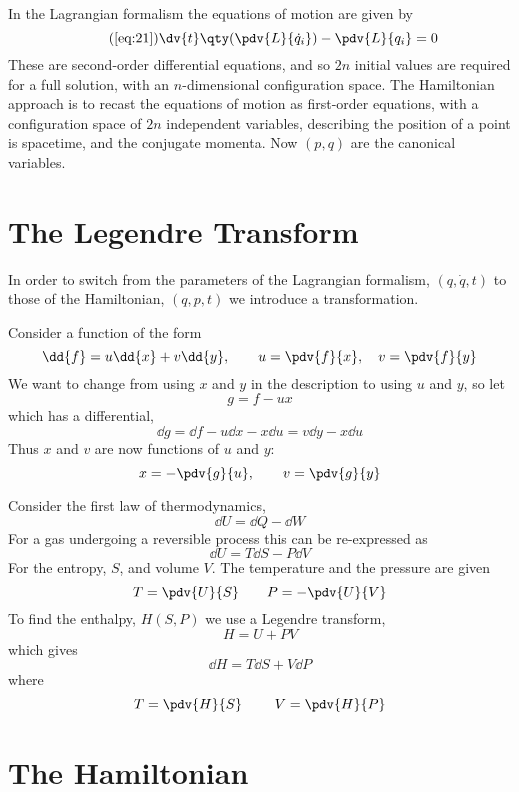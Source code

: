 In the Lagrangian formalism the equations of motion are given by
\begin{equation}
  \tag{\ref{eq:21}}
  \dv{t}\qty(\pdv{L}{\dot{q}_i}) - \pdv{L}{q_i} = 0
\end{equation}
These are second-order differential equations, and so $2n$ initial
values are required for a full solution, with an $n$-dimensional
configuration space. The Hamiltonian approach is to recast the
equations of motion as first-order equations, with a configuration
space of $2n$ independent variables, describing the position of a
point is spacetime, and the conjugate momenta. Now $(p, q)$ are the
canonical variables.

\section{The Legendre Transform}
\label{sec:legendre-transform}

In order to switch from the parameters of the Lagrangian formalism,
$(q, \dot{q}, t)$ to those of the Hamiltonian, $(q, p, t)$ we
introduce a transformation.

Consider a function of the form
\[ \dd{f} = u \dd{x} + v \dd{y}, \qquad u= \pdv{f}{x}, \quad
v=\pdv{f}{y} \] We want to change from using $x$ and $y$ in the
description to using $u$ and $y$, so let
\[ g = f - ux \]
which has a differential,
\[ \dd{g} = \dd{f} - u \dd{x} - x \dd{u} = v \dd{y} - x \dd{u} \] Thus
$x$ and $v$ are now functions of $u$ and $y$:
\[ x = - \pdv{g}{u}, \qquad v = \pdv{g}{y} \]

\begin{example}
  Consider the first law of thermodynamics,
  \[ \dd{U}= \dd{Q} - \dd{W} \] For a gas undergoing a reversible
  process this can be re-expressed as
  \[ \dd{U} = T \dd{S} - P \dd{V} \] For the entropy, $S$, and volume
  $V$. The temperature and the pressure are given 
  \[ T = \pdv{U}{S} \qquad P = - \pdv{U}{V} \] To find the enthalpy,
  $H(S,P)$ we use a Legendre transform,
  \[ H = U + PV \] which gives \[ \dd{H} = T \dd{S} + V \dd{P}\]
  where \[ T = \pdv{H}{S}\ \qquad V = \pdv{H}{P} \]
\end{example}

\section{The Hamiltonian}
\label{sec:hamiltonian}

